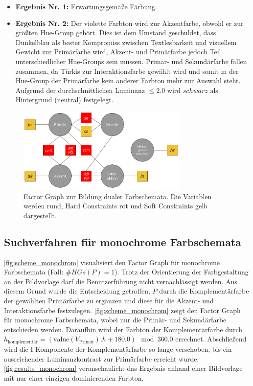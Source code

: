  \begin{itemize}
	\item \textbf{Ergebnis Nr. 1:} Erwartungsgemäße Färbung.
	\item \textbf{Ergebnis Nr. 2:} Der violette Farbton wird zur Akzentfarbe, obwohl er zur größten Hue-Group gehört. Dies ist dem Umstand geschuldet, dass Dunkelblau als bester Kompromiss zwischen Textlesbarkeit und visuellem Gewicht zur Primärfarbe wird, Akzent- und Primärfarbe jedoch Teil unterschiedlicher Hue-Groups sein müssen. Primär- und Sekundärfarbe fallen zusammen, da Türkis zur Interaktionsfarbe gewählt wird und somit in der Hue-Group der Primärfarbe kein anderer Farbton mehr zur Auswahl steht. Aufgrund der durchschnittlichen Luminanz $\leq 2.0$ wird $schwarz$ als Hintergrund (neutral) festgelegt.
\end{itemize}
 
\begin{figure}[h]
\centering
\includegraphics[width=0.75\textwidth]{img/scheme_dual.png}
\caption{Factor Graph zur Bildung dualer Farbschemata. Die Variablen werden rund, Hard Constraints rot und Soft Constraints gelb dargestellt.}
\label{fig:scheme_dual}
\end{figure}

\subsection{Suchverfahren für monochrome Farbschemata}

\autoref{fig:scheme_monochrom} visualisiert den Factor Graph für monochrome Farbschemata (Fall: $\#HGs(P) = 1$). Trotz der Orientierung der Farbgestaltung an der Bildvorlage darf die Benutzerführung nicht vernachlässigt werden. Aus diesem Grund wurde die Entscheidung getroffen, $P$ durch die Komplementärfarbe der gewählten Primärfarbe zu ergänzen und diese für die Akzent- und Interaktionsfarbe festzulegen. \autoref{fig:scheme_monochrom} zeigt den Factor Graph für monochrome Farbschemata, wobei nur die Primär- und Sekundärfarbe entschieden werden. Daraufhin wird der Farbton der Komplementärfarbe durch $h_\text{komplementär} = (\text{value}(V_\text{Primär}).h + 180.0) \mod 360.0$ errechnet. Abschließend wird die I-Komponente der Komplementärfarbe so lange verschoben, bis ein ausreichender Luminanzkontrast zur Primärfarbe erreicht wurde. \autoref{fig:results_monochrom} veranschaulicht das Ergebnis anhand einer Bildvorlage mit nur einer einzigen dominierenden Farbton.

